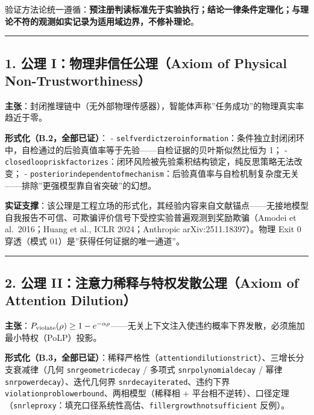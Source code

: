 \documentclass[
]{ctexart}
\renewcommand{\_}{\discretionary{}{}{\textunderscore}}
\renewcommand{\text}[1]{\textnormal{#1}}
\begin{document}
验证方法论统一遵循：\textbf{预注册判读标准先于实验执行；结论一律条件定理化；与理论不符的观测如实记录为适用域边界，不修补理论}。

\begin{center}\rule{0.5\linewidth}{0.5pt}\end{center}

\subsection{1. 公理 I：物理非信任公理（Axiom of Physical
Non-Trustworthiness）}\label{ux516cux7406-iux7269ux7406ux975eux4fe1ux4efbux516cux7406axiom-of-physical-non-trustworthiness-1}

\textbf{主张}：封闭推理链中（无外部物理传感器），智能体声称''任务成功''的物理真实率趋近于零。

\textbf{形式化（B.2，全部已证）}： -
\texttt{self\_verdict\_zero\_information}：条件独立封闭闭环中，自检通过的后验真值率等于先验------自检证据的贝叶斯似然比恒为
1； -
\texttt{closed\_loop\_risk\_factorizes}：闭环风险被先验乘积结构锁定，纯反思策略无法改变；
-
\texttt{posterior\_independent\_of\_mechanism}：后验真值率与自检机制复杂度无关------排除''更强模型靠自省突破''的幻想。

\textbf{实证支撑}：该公理是工程立场的形式化，其经验内容来自文献锚点------无接地模型自我报告不可信、可欺骗评价信号下受控实验普遍观测到奖励欺骗（Amodei
et al.~2016；Huang et al., ICLR 2024；Anthropic arXiv:2511.18397）。物理
Exit 0 穿透（模式 01）是''获得任何证据的唯一通道''。

\begin{center}\rule{0.5\linewidth}{0.5pt}\end{center}

\subsection{2. 公理 II：注意力稀释与特权发散公理（Axiom of Attention
Dilution）}\label{ux516cux7406-iiux6ce8ux610fux529bux7a00ux91caux4e0eux7279ux6743ux53d1ux6563ux516cux7406axiom-of-attention-dilution-1}

\textbf{主张}：\(P_{\text{violate}}(\rho) \ge 1 - e^{-\alpha\rho}\)------无关上下文注入使违约概率下界发散，必须施加最小特权（PoLP）投影。

\textbf{形式化（B.3，全部已证）}：稀释严格性（\texttt{attention\_dilution\_strict}）、三增长分支衰减律（几何
\texttt{snr\_geometric\_decay} / 多项式 \texttt{snr\_polynomial\_decay}
/ 幂律 \texttt{snr\_power\_decay}）、迭代几何界
\texttt{snr\_decay\_iterated}、违约下界
\texttt{violation\_prob\_lower\_bound}、两相模型（稀释相 +
平台相不逆转）、口径定理（\texttt{snr\_le\_proxy}：填充口径系统性高估、\texttt{filler\_growth\_not\_sufficient}
反例）。
\end{document}
